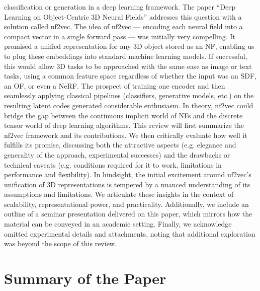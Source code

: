 \documentclass[11pt]{article}
\begin{document}
classification or generation in a deep learning framework. The paper “Deep Learning on Object-Centric 3D Neural Fields” addresses this question with a solution called nf2vec. The idea of nf2vec — encoding each neural field into a compact vector in a single forward pass — was initially very compelling. It promised a unified representation for any 3D object stored as an NF, enabling us to plug these embeddings into standard machine learning models. If successful, this would allow 3D tasks to be approached with the same ease as image or text tasks, using a common feature space regardless of whether the input was an SDF, an OF, or even a NeRF. The prospect of training one encoder and then seamlessly applying classical pipelines (classifiers, generative models, etc.) on the resulting latent codes generated considerable enthusiasm. In theory, nf2vec could bridge the gap between the continuous implicit world of NFs and the discrete tensor world of deep learning algorithms. This review will first summarize the nf2vec framework and its contributions. We then critically evaluate how well it fulfills its promise, discussing both the attractive aspects (e.g. elegance and generality of the approach, experimental successes) and the drawbacks or technical caveats (e.g. conditions required for it to work, limitations in performance and flexibility). In hindsight, the initial excitement around nf2vec’s unification of 3D representations is tempered by a nuanced understanding of its assumptions and limitations. We articulate these insights in the context of scalability, representational power, and practicality. Additionally, we include an outline of a seminar presentation delivered on this paper, which mirrors how the material can be conveyed in an academic setting. Finally, we acknowledge omitted experimental details and attachments, noting that additional exploration was beyond the scope of this review. \section{Summary of the Paper}
\end{document}
